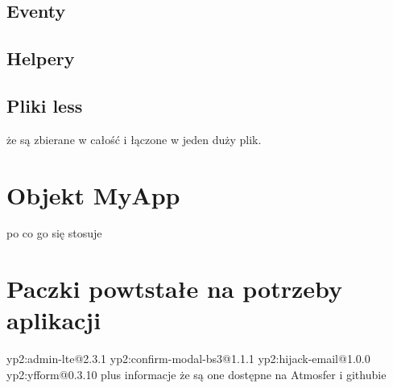   \subsection{Eventy}
  \subsection{Helpery}
  \subsection{Pliki less}
    że są zbierane w całość i łączone w jeden duży plik.
  
\section{Objekt MyApp}
  po co go się stosuje

  
\section{Paczki powtstałe na potrzeby aplikacji}
yp2:admin-lte@2.3.1
yp2:confirm-modal-bs3@1.1.1
yp2:hijack-email@1.0.0
yp2:yfform@0.3.10
plus informacje że są one dostępne na Atmosfer i githubie